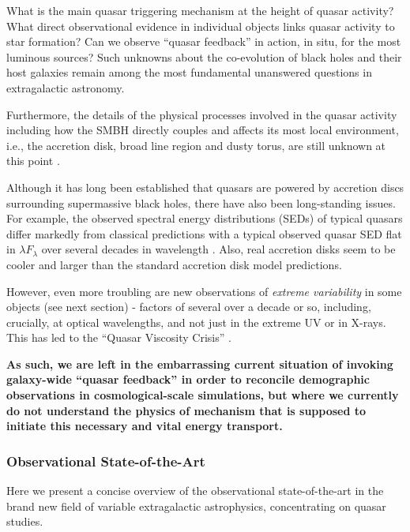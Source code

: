 \smallskip
\smallskip
\noindent
What is the main quasar triggering mechanism at the height of quasar
activity? What direct observational evidence in individual objects
links quasar activity to star formation?  Can we observe ``quasar
feedback'' in action, in situ, for the most luminous sources?  Such
unknowns about the co-evolution of black holes and their host galaxies
remain among the most fundamental unanswered questions in
extragalactic astronomy.

\smallskip 
\smallskip
\noindent
Furthermore, the details of the physical processes involved in the
quasar activity including how the SMBH directly couples and affects
its most local environment, i.e., the accretion disk, broad line
region and dusty torus, are still unknown at this point
\citep[e.g.,][]{Netzer2015, Padovani2017}.

\smallskip 
\smallskip
\noindent
Although it has long been established that quasars are powered by
accretion discs surrounding supermassive black holes, there have also
been long-standing issues. For example, the observed spectral energy
distributions (SEDs) of typical quasars
\citep[e.g.,][]{Koratkar_Blaes1999, Sirko_Goodman2003} differ markedly
from classical predictions \citep[][]{SS73, Pringle1981} with a
typical observed quasar SED flat in $\lambda F_{\lambda}$ over several
decades in wavelength \citep{Elvis1994, Richards2006b}.  Also, real
accretion disks seem to be cooler \cite[e.g., ][]{Lawrence2012} and
larger \cite[e.g.,][]{Pooley2007, Morgan2010, Morgan2012,
Mosquera2011} than the standard accretion disk model predictions.

\smallskip 
\smallskip
\noindent
However, even more troubling are new observations of {\it extreme
variability} in some objects (see next section) - factors of several
over a decade or so, including, crucially, at optical wavelengths, and
not just in the extreme UV or in X-rays. This has led to the ``Quasar
Viscosity Crisis'' \citep{Lawrence2018}.

\smallskip 
\smallskip
\noindent
{\bf As such, we are left in the embarrassing current situation of invoking
galaxy-wide ``quasar feedback'' in order to reconcile demographic
observations in cosmological-scale simulations, but where we currently
do not understand the physics of mechanism that is supposed to
initiate this necessary and vital energy transport.}


\subsubsection{Observational State-of-the-Art}
Here we present a concise overview of the observational
state-of-the-art in the brand new field of variable extragalactic
astrophysics, concentrating on quasar studies.

